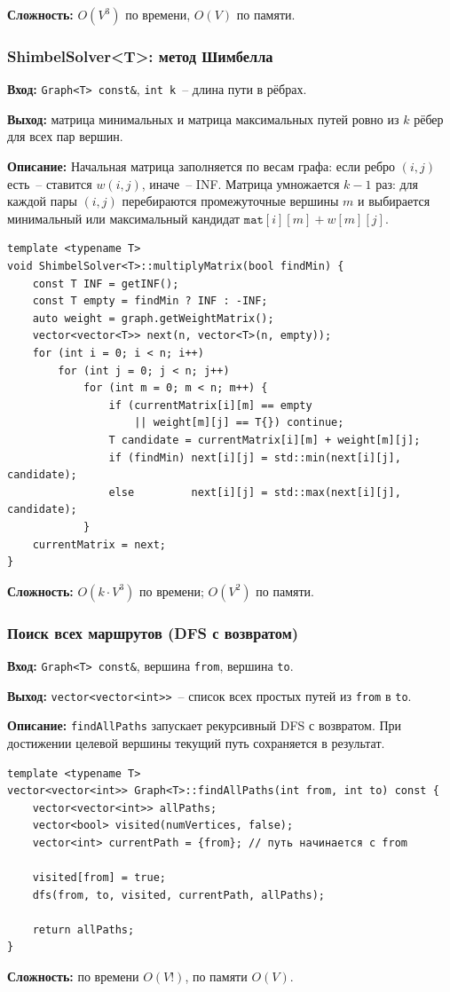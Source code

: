 \textbf{Сложность:} $O(V^3)$ по времени, $O(V)$ по памяти.

\subsubsection{ShimbelSolver\textless T\textgreater: метод Шимбелла}

\textbf{Вход:} \texttt{Graph<T> const\&}, \texttt{int k}~-- длина пути
в рёбрах.

\textbf{Выход:} матрица минимальных и матрица максимальных путей
ровно из $k$ рёбер для всех пар вершин.

\textbf{Описание:} Начальная матрица заполняется по весам графа: если
ребро $(i,j)$ есть~-- ставится $w(i,j)$, иначе~-- INF. Матрица умножается
$k-1$ раз: для каждой пары $(i,j)$ перебираются промежуточные вершины $m$
и выбирается минимальный или максимальный кандидат
$\texttt{mat}[i][m] + w[m][j]$.

\begin{lstlisting}[style=cstyle, caption={Матричное умножение для метода Шимбелла (shimbel.cpp)}]
template <typename T>
void ShimbelSolver<T>::multiplyMatrix(bool findMin) {
    const T INF = getINF();
    const T empty = findMin ? INF : -INF;
    auto weight = graph.getWeightMatrix();
    vector<vector<T>> next(n, vector<T>(n, empty));
    for (int i = 0; i < n; i++)
        for (int j = 0; j < n; j++)
            for (int m = 0; m < n; m++) {
                if (currentMatrix[i][m] == empty
                    || weight[m][j] == T{}) continue;
                T candidate = currentMatrix[i][m] + weight[m][j];
                if (findMin) next[i][j] = std::min(next[i][j], candidate);
                else         next[i][j] = std::max(next[i][j], candidate);
            }
    currentMatrix = next;
}
\end{lstlisting}

\textbf{Сложность:} $O(k \cdot V^3)$ по времени; $O(V^2)$ по памяти.

\subsubsection{Поиск всех маршрутов (DFS с возвратом)}

\textbf{Вход:} \texttt{Graph<T> const\&}, вершина \texttt{from},
вершина \texttt{to}.

\textbf{Выход:} \texttt{vector<vector<int>>}~-- список всех простых
путей из \texttt{from} в \texttt{to}.

\textbf{Описание:} \texttt{findAllPaths} запускает рекурсивный DFS
с возвратом. При достижении целевой вершины текущий
путь сохраняется в результат.
\begin{lstlisting}[style=cstyle, caption={Поиск всех маршрутов (graph.cpp)}]
template <typename T>
vector<vector<int>> Graph<T>::findAllPaths(int from, int to) const {
	vector<vector<int>> allPaths;
	vector<bool> visited(numVertices, false);
	vector<int> currentPath = {from}; // путь начинается с from

	visited[from] = true;
	dfs(from, to, visited, currentPath, allPaths);

	return allPaths;
}
\end{lstlisting}

\textbf{Сложность:} по времени $O(V!)$, по памяти $O(V)$. 